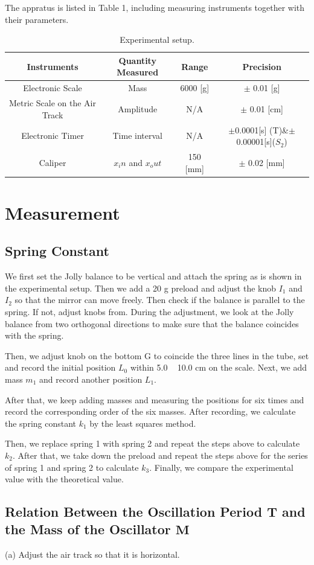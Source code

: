 \documentclass[a4paper]{report}
\begin{document}
	The appratus is listed in Table 1, including measuring instruments together with their parameters.
	\begin{table}[H]
		\centering
		\begin{tabular}{cccc}
			\hline
			Instruments&Quantity Measured&Range&Precision\\
			\hline
			Electronic Scale&Mass&6000 [g]&$\pm$ 0.01 [g]\\
			Metric Scale on the Air Track&Amplitude&N/A&$\pm$ 0.01 [cm]\\
			Electronic Timer&Time interval&N/A&$\pm$0.0001[s] (T)\&$\pm$0.00001[s]($S_2$)\\
			Caliper&$x_in$ and $x_out$&150 [mm]&$\pm$ 0.02 [mm]\\
			\hline
		\end{tabular}
	\caption{Experimental setup.}
	\end{table}
	\section{Measurement}
	\subsection{Spring Constant}
	We first set the Jolly balance to be vertical and attach the spring as is shown in the experimental setup. Then we add a 20 g preload and adjust the knob $I_1$ and $I_2$ so that the mirror can move freely. Then check if the balance is parallel to the spring. If not, adjust knobs from. During the adjustment, we look at the Jolly balance from two orthogonal directions to make sure that the balance coincides with the spring.
	
	Then, we adjust knob on the bottom G to coincide the three lines in the tube, set and record the initial position $L_0$ within 5.0 ~ 10.0 cm on the scale. Next, we add mass $m_1$ and record another position $L_1$.
	
	After that, we keep adding masses and measuring the positions for six times and record the corresponding order of the six masses. After recording, we calculate the spring constant $k_1$ by the least squares method.
	
	Then, we replace spring 1 with spring 2 and repeat the steps above to calculate $k_2$. After that, we take down the preload and repeat the steps above for the series of spring 1 and spring 2 to calculate $k_3$. Finally, we compare the experimental value with the theoretical value.
	\subsection{Relation Between the Oscillation Period $\bm{T}$ and the Mass of the Oscillator $\bm{M}$}
	(a) Adjust the air track so that it is horizontal.
	
\end{document}

